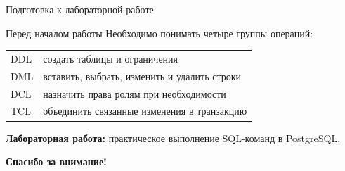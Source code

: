 \documentclass[aspectratio=169]{beamer}
\begin{document}
\begin{frame}{Подготовка к лабораторной работе}
\begin{block}{Перед началом работы}
Необходимо понимать четыре группы операций:
\end{block}

\begin{center}
\begin{tabular}{p{}|p{}}
\toprule
DDL & создать таблицы и ограничения\\
DML & вставить, выбрать, изменить и удалить строки\\
DCL & назначить права ролям при необходимости\\
TCL & объединить связанные изменения в транзакцию\\
\bottomrule
\end{tabular}
\end{center}

\vspace{0.3cm}
\textbf{Лабораторная работа:} практическое выполнение SQL-команд в PostgreSQL.
\end{frame}

\begin{frame}
\thispagestyle{empty}
\vspace*{\fill}
\begin{center}
{\LARGE\bfseries Спасибо за внимание!}
\end{center}
\vspace*{\fill}
\end{frame}
\end{document}
